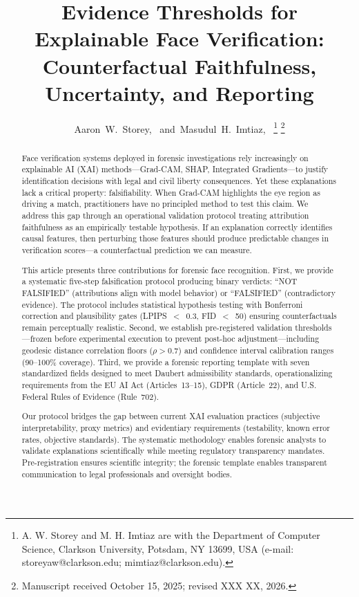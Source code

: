 \documentclass[journal]{IEEEtran}
\title{Evidence Thresholds for Explainable Face Verification:\\
Counterfactual Faithfulness, Uncertainty, and Reporting}
\author{Aaron~W.~Storey,~\IEEEmembership{Student Member,~IEEE,}
        and~Masudul~H.~Imtiaz,~\IEEEmembership{Member,~IEEE}%
\thanks{A. W. Storey and M. H. Imtiaz are with the Department of Computer Science,
Clarkson University, Potsdam, NY 13699, USA (e-mail: storeyaw@clarkson.edu; mimtiaz@clarkson.edu).}%
\thanks{Manuscript received October 15, 2025; revised XXX XX, 2026.}%
}
\begin{document}
\maketitle

\begin{abstract}
Face verification systems deployed in forensic investigations rely increasingly on explainable AI (XAI) methods—Grad-CAM, SHAP, Integrated Gradients—to justify identification decisions with legal and civil liberty consequences. Yet these explanations lack a critical property: falsifiability. When Grad-CAM highlights the eye region as driving a match, practitioners have no principled method to test this claim. We address this gap through an operational validation protocol treating attribution faithfulness as an empirically testable hypothesis. If an explanation correctly identifies causal features, then perturbing those features should produce predictable changes in verification scores—a counterfactual prediction we can measure.

This article presents three contributions for forensic face recognition. First, we provide a systematic five-step falsification protocol producing binary verdicts: ``NOT FALSIFIED'' (attributions align with model behavior) or ``FALSIFIED'' (contradictory evidence). The protocol includes statistical hypothesis testing with Bonferroni correction and plausibility gates (LPIPS~$<$~0.3, FID~$<$~50) ensuring counterfactuals remain perceptually realistic. Second, we establish pre-registered validation thresholds—frozen before experimental execution to prevent post-hoc adjustment—including geodesic distance correlation floors ($\rho > 0.7$) and confidence interval calibration ranges (90--100\% coverage). Third, we provide a forensic reporting template with seven standardized fields designed to meet Daubert admissibility standards, operationalizing requirements from the EU AI Act (Articles~13--15), GDPR (Article~22), and U.S. Federal Rules of Evidence (Rule~702).

Our protocol bridges the gap between current XAI evaluation practices (subjective interpretability, proxy metrics) and evidentiary requirements (testability, known error rates, objective standards). The systematic methodology enables forensic analysts to validate explanations scientifically while meeting regulatory transparency mandates. Pre-registration ensures scientific integrity; the forensic template enables transparent communication to legal professionals and oversight bodies.
\end{abstract}
\end{document}
